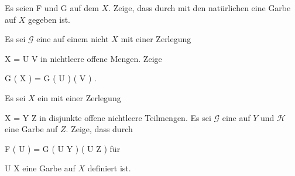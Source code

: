 \setcounter{section}{4}


{}
{





Es seien
\mathkor {} {{ \mathcal  F   }} {und} {{ \mathcal  G   }} {}
auf dem
$X$. Zeige, dass durch
 mit den natürlichen
eine Garbe auf $X$ gegeben ist.





}
{} {}

{}
{





Es sei ${ \mathcal  G   }$ eine
auf einem nicht
$X$ mit einer Zerlegung

\mavergleichskette
{\vergleichskette
{X
}
{ = }{ U \uplus V
}
{  }{
}
{    }{
}
{   }{
}
}
{}{}{}
in
nichtleere offene Mengen. Zeige

\mavergleichskette
{\vergleichskette
{ { \mathcal  G   }  \left(   X    \right)
}
{ = }{ { \mathcal  G   }  \left(   U    \right)   \left(   V    \right)
}
{  }{
}
{    }{
}
{   }{
}
}
{}{}{.}





}
{} {}

{}
{





Es sei $X$ ein
mit einer Zerlegung

\mavergleichskette
{\vergleichskette
{X
}
{ = }{ Y \uplus Z
}
{  }{
}
{    }{
}
{   }{
}
}
{}{}{}
in disjunkte offene nichtleere Teilmengen. Es sei ${ \mathcal  G   }$ eine
auf $Y$ und ${ \mathcal  H   }$ eine Garbe auf $Z$. Zeige, dass durch

\mavergleichskettedisp
{\vergleichskette
{ { \mathcal  F   }  \left(   U   \right)
}
{ =} { { \mathcal  G   }  \left(   U \cap Y   \right)    \left(   U \cap Z   \right)
}
{ } {
}
{ } {
}
{ } {
}
}
{}{}{}
für

\mavergleichskette
{\vergleichskette
{U
}
{ \subseteq }{ X
}
{  }{
}
{    }{
}
{   }{
}
}
{}{}{}
eine Garbe auf $X$ definiert ist.





}
{} {}

